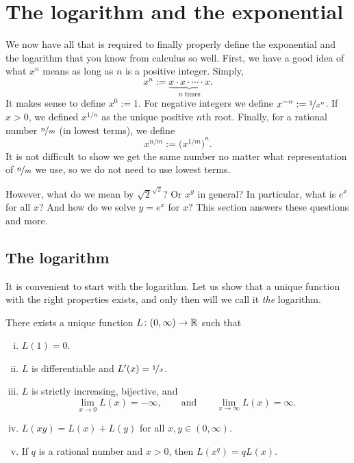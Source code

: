 
\sectionnewpage
\section{The logarithm and the exponential}
\label{sec:logandexp}


We now have all that is required to finally properly define the exponential
and the
logarithm that you know from calculus so well.
First, we have a good idea of what $x^n$ means as long as
$n$ is a positive integer.  Simply,
\begin{equation*}
x^n := \underbrace{x \cdot x \cdot \cdots \cdot x}_{\text{$n$ times}} .
\end{equation*}
It makes sense to define $x^0 := 1$.
For negative integers we define $x^{-n} := \nicefrac{1}{x^n}$.
If $x > 0$,
we defined $x^{1/n}$ as
the unique positive $n$th root.  Finally, for a rational
number $\nicefrac{n}{m}$ (in lowest terms), we define
\begin{equation*}
x^{n/m} := {\bigl(x^{1/m}\bigr)}^n .
\end{equation*}
It is not difficult to show 
we get the same number no matter what
representation of $\nicefrac{n}{m}$ we use, so we do not need to use
lowest terms.

However, what do we mean by $\sqrt{2}^{\sqrt{2}}$?  Or
$x^y$ in general?  In particular, what is $e^x$ for all $x$?
And how do we solve $y=e^x$ for $x$?
This section answers these questions and more.

\subsection{The logarithm}

It is convenient to start with the logarithm.  
Let us show that
a unique function with the right properties exists, and only then will
we call it \emph{the} logarithm.

\begin{prop}
There exists a unique function $L \colon (0,\infty) \to {\mathbb{R}}$ such that
\begin{enumerate}[(i)]
\item \label{it:log:i}
$L(1) = 0$.
\item \label{it:log:ii}
$L$ is differentiable and $L'(x) = \nicefrac{1}{x}$.
\item \label{it:log:iii}
$L$ is strictly increasing, bijective, and
\begin{equation*}
\lim_{x\to 0} L(x) = -\infty , \qquad \text{and} \qquad
\lim_{x\to \infty} L(x) = \infty .
\end{equation*}
\item \label{it:log:iv}
$L(xy) = L(x)+L(y)$ for all $x,y \in (0,\infty)$.
\item \label{it:log:v}
If $q$ is a rational number and $x > 0$, then
$L(x^q) = q L(x)$.
\end{enumerate}
\end{prop}

